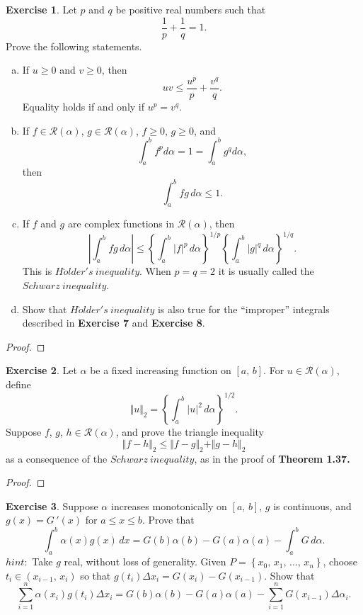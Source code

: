 \documentclass[12pt]{book}
\theoremstyle{definition}
\newtheorem{exe}{Exercise}
\begin{document}
	\newpage
	\begin{exe}
		Let $p$ and $q$ be positive real numbers such that $$\dfrac{1}{p}+\dfrac{1}{q}=1.$$ Prove the following statements.
		\begin{enumerate}[(a)]
			\item If $u\geq0$ and $v\geq0$, then $$uv\leq \dfrac{u^p}{p}+\dfrac{v^q}{q}.$$ Equality holds if and only if $u^p=v^q$.
			\item If $f\in\mathscr{R}(\alpha)$, $g\in\mathscr{R}(\alpha)$, $f\geq 0$, $g\geq 0$, and $$\int_a^b f^p d\alpha =1=\int_a ^b g^q d\alpha,$$ then $$\int_a^b fg\,d\alpha\leq 1.$$
			\item If $f$ and $g$ are complex functions in $\mathscr{R}(\alpha)$, then $$\left\vert \int_a^b fg\,d\alpha\right\vert\leq\left\{\int_a^b |f|^p\,d\alpha\right\}^{1/p}\left\{\int_a^b |g|^q\,d\alpha\right\}^{1/q}.$$ This is $H\ddot{o}lder's~inequality$. When $p=q=2$ it is usually called the $Schwarz~inequality$.
			\item Show that $H\ddot{o}lder's~inequality$ is also true for the ``improper'' integrals described in \textbf{Exercise 7} and \textbf{Exercise 8}.
		\end{enumerate}
	\end{exe}
	\newpage
	\begin{proof}
	\end{proof}
	\newpage
	\begin{exe}
		Let $\alpha$ be a fixed increasing function on $[a,\,b]$. For $u\in\mathscr{R}(\alpha)$, define $$\Vert u\Vert_2=\left\{\int_a^b |u|^2\,d\alpha\right\}^{1/2}.$$ Suppose $f$, $g$, $h\in\mathscr{R}(\alpha)$, and prove the triangle inequality $$\Vert f-h\Vert_2\leq\Vert f-g\Vert_2+\Vert g-h\Vert_2$$ as a consequence of the $Schwarz~inequality$, as in the proof of \textbf{Theorem 1.37.}
	\end{exe}
	\begin{proof}
	\end{proof}
	\newpage
	\setcounter{exe}{16}
	\begin{exe}
		Suppose $\alpha$ increases monotonically on $[a,\,b]$, $g$ is continuous, and $g(x)=G\,'(x)$ for $a\leq x \leq b$. Prove that $$\int_a^b \alpha(x)g(x)\,dx=G(b)\alpha(b)-G(a)\alpha(a)-\int_a^b G\,d\alpha.$$
		$hint:$ Take $g$ real, without loss of generality. Given $P=\left\{x_0,\,x_1,\,\ldots,\,x_n\right\}$, choose $t_i\in(x_{i-1},\,x_i)$ so that $g(t_i)\Delta x_i=G(x_i)-G(x_{i-1}).$ Show that $$\sum_{i=1}^n\alpha(x_i)g(t_i)\Delta x_i=G(b)\alpha(b)-G(a)\alpha(a)-\sum_{i=1}^n G(x_{i-1})\Delta\alpha_i.$$
	\end{exe}
\end{document}
